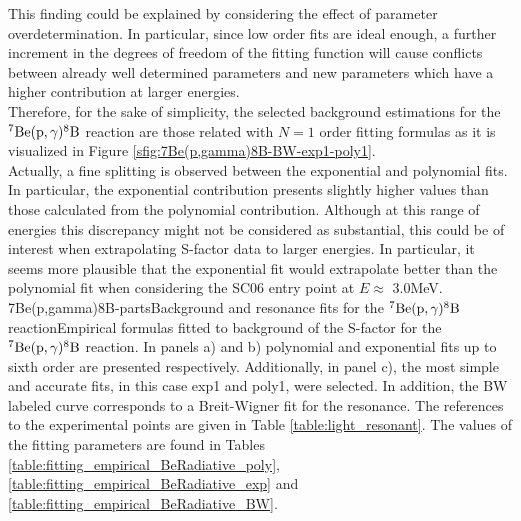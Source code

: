 \documentclass[openany]{book}
\begin{document}
This finding could be explained by considering the effect of parameter overdetermination. In particular, since low order fits are ideal enough, a further increment in the degrees of freedom of the fitting function will cause conflicts between already well determined parameters and new parameters which have a higher contribution at larger energies.  \\

Therefore, for the sake of simplicity, the selected background estimations for the $\mathrm{{}^{7}Be(p, \gamma){}^{8}B}$ reaction are those related with $N = 1$ order fitting formulas as it is visualized in Figure \ref{sfig:7Be(p,gamma)8B-BW-exp1-poly1}. \\

Actually, a fine splitting is observed between the exponential and polynomial fits. In particular, the exponential contribution presents slightly higher values than those calculated from the polynomial contribution. Although at this range of energies this discrepancy might not be considered as substantial, this could be of interest when extrapolating S-factor data to larger energies. In particular, it seems more plausible that the exponential fit would extrapolate better than the polynomial fit when considering the SC06 entry point at $E \approx$ 3.0MeV. \\

{7Be(p,gamma)8B-parts}{Background and resonance fits for the $\mathrm{{}^{7}Be(p, \gamma){}^{8}B}$ reaction}{Empirical formulas fitted to background of the S-factor for the $\mathrm{{}^{7}Be(p, \gamma){}^{8}B}$ reaction. In panels a) and b) polynomial and exponential fits up to sixth order are presented respectively. Additionally, in panel c), the most simple and accurate fits, in this case exp1 and poly1, were selected. In addition, the BW labeled curve corresponds to a Breit-Wigner fit for the resonance.  The references to the experimental points are given in Table \ref{table:light_resonant}. The values of the fitting parameters are found in Tables \ref{table:fitting_empirical_BeRadiative_poly}, \ref{table:fitting_empirical_BeRadiative_exp} and  \ref{table:fitting_empirical_BeRadiative_BW}.}



\end{document}

